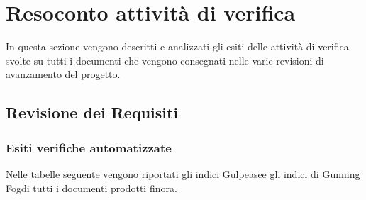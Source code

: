 \section{Resoconto attività di verifica}
In questa sezione vengono descritti e analizzati gli esiti delle attività
di verifica svolte su tutti i documenti che vengono consegnati nelle varie 
revisioni di avanzamento del progetto.

\subsection{Revisione dei Requisiti}


\subsubsection{Esiti verifiche automatizzate}
Nelle tabelle seguente vengono riportati gli indici Gulpease\glosp e gli indici di Gunning Fog\glosp di tutti
i documenti prodotti finora.

	
